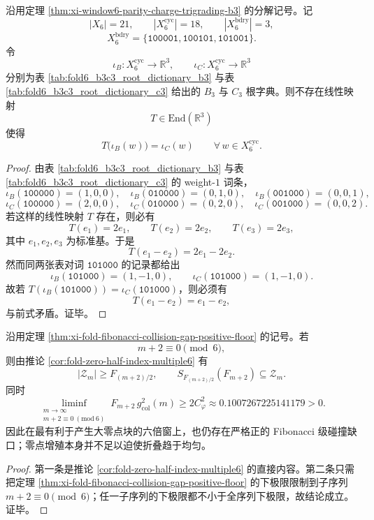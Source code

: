 \begin{theorem}\label{thm:xi-window6-b3c3-no-global-linear-unifier}
沿用定理 \ref{thm:xi-window6-parity-charge-trigrading-b3} 的分解记号。记
\[
|X_6|=21,\qquad |X_6^{\mathrm{cyc}}|=18,\qquad |X_6^{\mathrm{bdry}}|=3,
\]
\[
X_6^{\mathrm{bdry}}
=
\{\texttt{100001},\texttt{100101},\texttt{101001}\}.
\]
令
\[
\iota_B:X_6^{\mathrm{cyc}}\to \mathbb R^3,
\qquad
\iota_C:X_6^{\mathrm{cyc}}\to \mathbb R^3
\]
分别为表 \ref{tab:fold6_b3c3_root_dictionary_b3} 与表 \ref{tab:fold6_b3c3_root_dictionary_c3} 给出的 \(B_3\) 与 \(C_3\) 根字典。则不存在线性映射
\[
T\in \mathrm{End}(\mathbb R^3)
\]
使得
\[
T\bigl(\iota_B(w)\bigr)=\iota_C(w)
\qquad
\forall\,w\in X_6^{\mathrm{cyc}}.
\]
\end{theorem}
\begin{proof}
由表 \ref{tab:fold6_b3c3_root_dictionary_b3} 与表 \ref{tab:fold6_b3c3_root_dictionary_c3} 的 weight-\(1\) 词条，
\[
\iota_B(\texttt{100000})=(1,0,0),\quad
\iota_B(\texttt{010000})=(0,1,0),\quad
\iota_B(\texttt{001000})=(0,0,1),
\]
\[
\iota_C(\texttt{100000})=(2,0,0),\quad
\iota_C(\texttt{010000})=(0,2,0),\quad
\iota_C(\texttt{001000})=(0,0,2).
\]
若这样的线性映射 \(T\) 存在，则必有
\[
T(e_1)=2e_1,\qquad T(e_2)=2e_2,\qquad T(e_3)=2e_3,
\]
其中 \(e_1,e_2,e_3\) 为标准基。于是
\[
T(e_1-e_2)=2e_1-2e_2.
\]
然而同两张表对词 \(\texttt{101000}\) 的记录都给出
\[
\iota_B(\texttt{101000})=(1,-1,0),
\qquad
\iota_C(\texttt{101000})=(1,-1,0).
\]
故若 \(T(\iota_B(\texttt{101000}))=\iota_C(\texttt{101000})\)，则必须有
\[
T(e_1-e_2)=e_1-e_2,
\]
与前式矛盾。证毕。
\end{proof}



\begin{corollary}[六倍窗大零块与非消失碰撞缺口的共存]\label{cor:xi-window6-zero-block-and-collision-gap-coexistence}
沿用定理 \ref{thm:xi-fold-fibonacci-collision-gap-positive-floor} 的记号。若
\[
m+2\equiv 0\pmod 6,
\]
则由推论 \ref{cor:fold-zero-half-index-multiple6} 有
\[
\boxed{\;
|\mathcal Z_m|\ge F_{(m+2)/2},
\qquad
S_{F_{(m+2)/2}}(F_{m+2})\subseteq \mathcal Z_m.\;}
\]
同时
\[
\boxed{\;
\liminf_{\substack{m\to\infty\\ m+2\equiv 0\ (\mathrm{mod}\ 6)}}
F_{m+2}\,g_{\mathrm{col}}^2(m)
\ge
2C_\varphi^2
\approx 0.1007267225141179>0.\;}
\]
因此在最有利于产生大零点块的六倍窗上，也仍存在严格正的 Fibonacci 级碰撞缺口；零点增殖本身并不足以迫使折叠趋于均匀。
\end{corollary}
\begin{proof}
第一条是推论 \ref{cor:fold-zero-half-index-multiple6} 的直接内容。第二条只需把定理 \ref{thm:xi-fold-fibonacci-collision-gap-positive-floor} 的下极限限制到子序列 \(m+2\equiv 0\pmod 6\)；任一子序列的下极限都不小于全序列下极限，故结论成立。证毕。
\end{proof}

